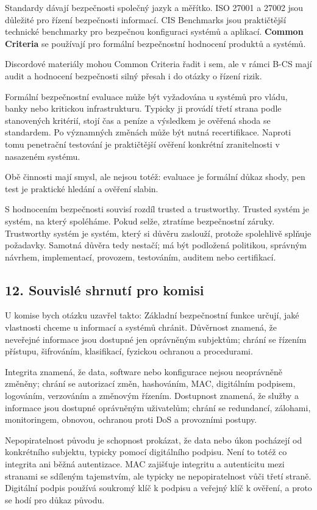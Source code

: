 \documentclass[11pt,a4paper]{article}
\begin{document}
Standardy dávají bezpečnosti společný jazyk a měřítko. ISO 27001 a 27002 jsou důležité pro řízení bezpečnosti informací. CIS Benchmarks jsou praktičtější technické benchmarky pro bezpečnou konfiguraci systémů a aplikací. \textbf{Common Criteria} se používají pro formální bezpečnostní hodnocení produktů a systémů.

Discordové materiály mohou Common Criteria řadit i sem, ale v rámci B-CS mají audit a hodnocení bezpečnosti silný přesah i do otázky o řízení rizik.

Formální bezpečnostní evaluace může být vyžadována u systémů pro vládu, banky nebo kritickou infrastrukturu. Typicky ji provádí třetí strana podle stanovených kritérií, stojí čas a peníze a výsledkem je ověřená shoda se standardem. Po významných změnách může být nutná recertifikace. Naproti tomu penetrační testování je praktičtější ověření konkrétní zranitelnosti v nasazeném systému.

Obě činnosti mají smysl, ale nejsou totéž: evaluace je formální důkaz shody, pen test je praktické hledání a ověření slabin.

S hodnocením bezpečnosti souvisí rozdíl trusted a trustworthy. Trusted systém je systém, na který spoléháme. Pokud selže, ztratíme bezpečnostní záruky. Trustworthy systém je systém, který si důvěru zaslouží, protože spolehlivě splňuje požadavky. Samotná důvěra tedy nestačí; má být podložená politikou, správným návrhem, implementací, provozem, testováním, auditem nebo certifikací.

\subsection*{12. Souvislé shrnutí pro komisi}

U komise bych otázku uzavřel takto: Základní bezpečnostní funkce určují, jaké vlastnosti chceme u informací a systémů chránit. Důvěrnost znamená, že neveřejné informace jsou dostupné jen oprávněným subjektům; chrání se řízením přístupu, šifrováním, klasifikací, fyzickou ochranou a procedurami.

Integrita znamená, že data, software nebo konfigurace nejsou neoprávněně změněny; chrání se autorizací změn, hashováním, MAC, digitálním podpisem, logováním, verzováním a změnovým řízením. Dostupnost znamená, že služby a informace jsou dostupné oprávněným uživatelům; chrání se redundancí, zálohami, monitoringem, obnovou, ochranou proti DoS a provozními postupy.

Nepopiratelnost původu je schopnost prokázat, že data nebo úkon pocházejí od konkrétního subjektu, typicky pomocí digitálního podpisu. Není to totéž co integrita ani běžná autentizace. MAC zajišťuje integritu a autenticitu mezi stranami se sdíleným tajemstvím, ale typicky ne nepopiratelnost vůči třetí straně. Digitální podpis používá soukromý klíč k podpisu a veřejný klíč k ověření, a proto se hodí pro důkaz původu.
\end{document}
